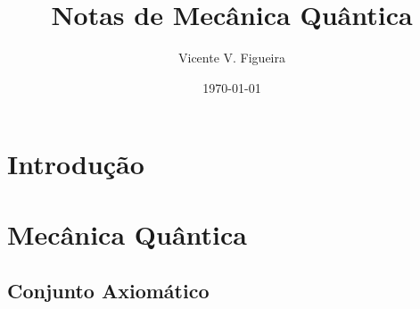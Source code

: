 \documentclass[twoside]{amsart}
\title{
Notas de Mecânica Quântica
}
\author{
  Vicente V. Figueira
       }
\date{\today}
\numberwithin{equation}{section}
\begin{document}
\maketitle

\tableofcontents


\section{Introdução}



\section{Mecânica Quântica}

\subsection{Conjunto Axiomático}


\end{document}
